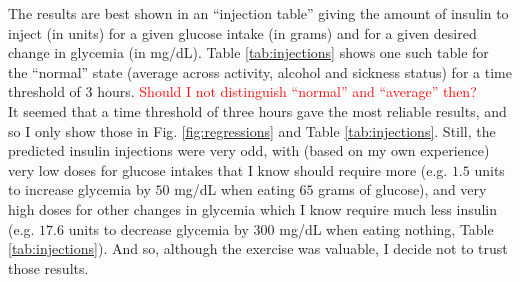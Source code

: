 The results are best shown in an ``injection table'' giving the amount of insulin to inject (in units) for a given glucose intake (in grams) and for a given desired change in glycemia (in mg/dL).
Table \ref{tab:injections} shows one such table for the ``normal'' state (average across activity, alcohol and sickness status) for a time threshold of 3 hours.
\textcolor{red}{Should I not distinguish ``normal'' and ``average'' then?}\\

It seemed that a time threshold of three hours gave the most reliable results, and so I only show those in Fig. \ref{fig:regressions} and Table \ref{tab:injections}.
Still, the predicted insulin injections were very odd, with (based on my own experience) very low doses for glucose intakes that I know should require more (e.g. $1.5$ units to increase glycemia by $50$ mg/dL when eating $65$ grams of glucose), and very high doses for other changes in glycemia which I know require much less insulin (e.g. $17.6$ units to decrease glycemia by $300$ mg/dL when eating nothing, Table \ref{tab:injections}). 
And so, although the exercise was valuable, I decide not to trust those results.